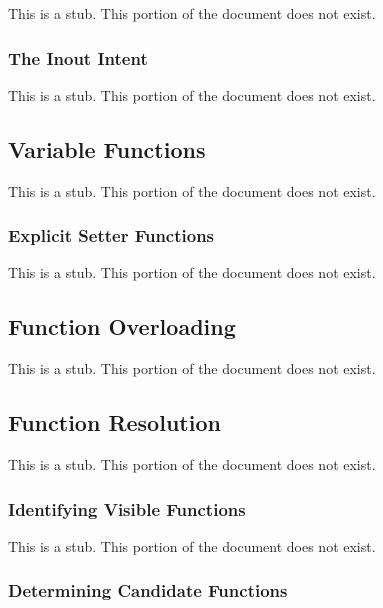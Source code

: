 This is a stub.  This portion of the document does not exist.

\subsubsection{The Inout Intent}
\label{The_Inout_Intent}

This is a stub.  This portion of the document does not exist.

\subsection{Variable Functions}
\label{Variable_Functions}

This is a stub.  This portion of the document does not exist.

\subsubsection{Explicit Setter Functions}
\label{Explicit_Setter_Functions}

This is a stub.  This portion of the document does not exist.

\subsection{Function Overloading}
\label{Function_Overloading}

This is a stub.  This portion of the document does not exist.

\subsection{Function Resolution}
\label{Function_Resolution}

This is a stub.  This portion of the document does not exist.

\subsubsection{Identifying Visible Functions}
\label{Identifying_Visible_Functions}

This is a stub.  This portion of the document does not exist.

\subsubsection{Determining Candidate Functions}
\label{Determining_Candidate_Functions}

